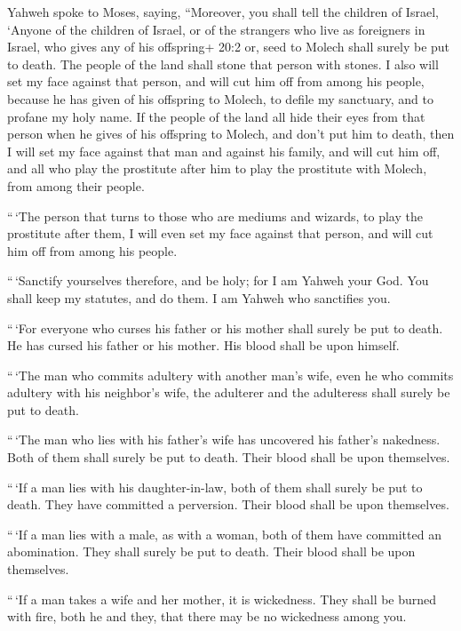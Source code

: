  Yahweh spoke to Moses, saying,  ``Moreover, you
shall tell the children of Israel, `Anyone of the children of Israel, or
of the strangers who live as foreigners in Israel, who gives any of his
offspring+ 20:2 or, seed to Molech shall surely be put to death. The
people of the land shall stone that person with stones.  I
also will set my face against that person, and will cut him off from
among his people, because he has given of his offspring to Molech, to
defile my sanctuary, and to profane my holy name.  If the
people of the land all hide their eyes from that person when he gives of
his offspring to Molech, and don't put him to death,  then I
will set my face against that man and against his family, and will cut
him off, and all who play the prostitute after him to play the
prostitute with Molech, from among their people.

 ``\,`The person that turns to those who are mediums and
wizards, to play the prostitute after them, I will even set my face
against that person, and will cut him off from among his people.

 ``\,`Sanctify yourselves therefore, and be holy; for I am
Yahweh your God.  You shall keep my statutes, and do them. I
am Yahweh who sanctifies you.

 ``\,`For everyone who curses his father or his mother shall
surely be put to death. He has cursed his father or his mother. His
blood shall be upon himself.

 ``\,`The man who commits adultery with another man's wife,
even he who commits adultery with his neighbor's wife, the adulterer and
the adulteress shall surely be put to death.

 ``\,`The man who lies with his father's wife has uncovered
his father's nakedness. Both of them shall surely be put to death. Their
blood shall be upon themselves.

 ``\,`If a man lies with his daughter-in-law, both of them
shall surely be put to death. They have committed a perversion. Their
blood shall be upon themselves.

 ``\,`If a man lies with a male, as with a woman, both of
them have committed an abomination. They shall surely be put to death.
Their blood shall be upon themselves.

 ``\,`If a man takes a wife and her mother, it is
wickedness. They shall be burned with fire, both he and they, that there
may be no wickedness among you.

